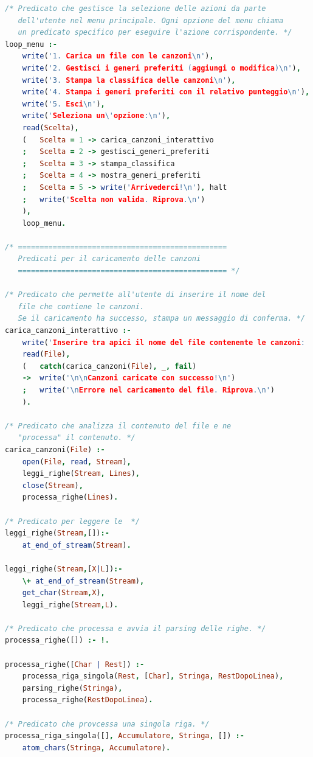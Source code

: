\documentclass[a4paper,11pt]{article}
\begin{document}
\begin{lstlisting}[language=Prolog]
/* Predicato che gestisce la selezione delle azioni da parte 
   dell'utente nel menu principale. Ogni opzione del menu chiama
   un predicato specifico per eseguire l'azione corrispondente. */
loop_menu :-
    write('1. Carica un file con le canzoni\n'),
    write('2. Gestisci i generi preferiti (aggiungi o modifica)\n'),
    write('3. Stampa la classifica delle canzoni\n'),
    write('4. Stampa i generi preferiti con il relativo punteggio\n'),
    write('5. Esci\n'),
    write('Seleziona un\'opzione:\n'),
    read(Scelta),
    (   Scelta = 1 -> carica_canzoni_interattivo
    ;   Scelta = 2 -> gestisci_generi_preferiti
    ;   Scelta = 3 -> stampa_classifica
    ;   Scelta = 4 -> mostra_generi_preferiti
    ;   Scelta = 5 -> write('Arrivederci!\n'), halt
    ;   write('Scelta non valida. Riprova.\n')
    ),
    loop_menu.

/* ================================================
   Predicati per il caricamento delle canzoni
   ================================================ */

/* Predicato che permette all'utente di inserire il nome del
   file che contiene le canzoni.
   Se il caricamento ha successo, stampa un messaggio di conferma. */
carica_canzoni_interattivo :-
    write('Inserire tra apici il nome del file contenente le canzoni: '), nl,
    read(File),
    (   catch(carica_canzoni(File), _, fail)
    ->  write('\n\nCanzoni caricate con successo!\n')
    ;   write('\nErrore nel caricamento del file. Riprova.\n')
    ).

/* Predicato che analizza il contenuto del file e ne
   "processa" il contenuto. */
carica_canzoni(File) :-
    open(File, read, Stream),
    leggi_righe(Stream, Lines),
    close(Stream),
    processa_righe(Lines).

/* Predicato per leggere le  */
leggi_righe(Stream,[]):-
    at_end_of_stream(Stream).

leggi_righe(Stream,[X|L]):-
    \+ at_end_of_stream(Stream),
    get_char(Stream,X),
    leggi_righe(Stream,L).

/* Predicato che processa e avvia il parsing delle righe. */
processa_righe([]) :- !.

processa_righe([Char | Rest]) :-
    processa_riga_singola(Rest, [Char], Stringa, RestDopoLinea),
    parsing_righe(Stringa),
    processa_righe(RestDopoLinea).

/* Predicato che provcessa una singola riga. */
processa_riga_singola([], Accumulatore, Stringa, []) :-
    atom_chars(Stringa, Accumulatore).


\end{lstlisting}
\end{document}
